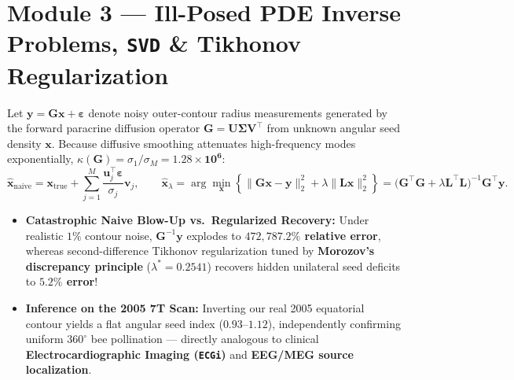 \documentclass[10.5pt,a4paper]{article}
\begin{document}
\section{Module 3 --- Ill-Posed PDE Inverse Problems, \texttt{SVD} \& Tikhonov Regularization}
\label{sec:inverse}

Let $\mathbf{y} = \mathbf{G}\mathbf{x} + \boldsymbol{\varepsilon}$ denote noisy outer-contour radius measurements generated by the forward paracrine diffusion operator $\mathbf{G} = \mathbf{U}\boldsymbol{\Sigma}\mathbf{V}^\top$ from unknown angular seed density $\mathbf{x}$. Because diffusive smoothing attenuates high-frequency modes exponentially, $\kappa(\mathbf{G}) = \sigma_1/\sigma_M = \mathbf{1.28\times 10^6}$:
\begin{equation}
    \hat{\mathbf{x}}_{\text{naive}} = \mathbf{x}_{\text{true}} + \sum_{j=1}^{M}\frac{\mathbf{u}_j^\top \boldsymbol{\varepsilon}}{\sigma_j}\mathbf{v}_j, \qquad \hat{\mathbf{x}}_\lambda = \arg\min_{\mathbf{x}}\!\left\{\lVert \mathbf{G}\mathbf{x} - \mathbf{y}\rVert_2^2 + \lambda\lVert \mathbf{L}\mathbf{x}\rVert_2^2\right\} = \big(\mathbf{G}^\top\mathbf{G} + \lambda\mathbf{L}^\top\mathbf{L}\big)^{-1}\mathbf{G}^\top\mathbf{y}.
\end{equation}
\begin{itemize}
    \item \textbf{Catastrophic Naive Blow-Up vs.\ Regularized Recovery:} Under realistic $1\%$ contour noise, $\mathbf{G}^{-1}\mathbf{y}$ explodes to \textbf{$472{,}787.2\%$ relative error}, whereas second-difference Tikhonov regularization tuned by \textbf{Morozov's discrepancy principle} ($\lambda^* = 0.2541$) recovers hidden unilateral seed deficits to \textbf{$5.2\%$ error}!
    \item \textbf{Inference on the 2005 7T Scan:} Inverting our real 2005 equatorial contour yields a flat angular seed index ($0.93\text{--}1.12$), independently confirming uniform $360^\circ$ bee pollination --- directly analogous to clinical \textbf{Electrocardiographic Imaging (\texttt{ECGi})} and \textbf{EEG/MEG source localization}.
\end{itemize}

\end{document}
